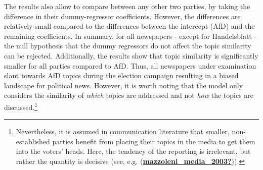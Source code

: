 \documentclass[
  12pt,
]{article}
\begin{document}
The results also allow to compare between any other two parties, by
taking the difference in their dummy-regressor coefficients. However,
the differences are relatively small compared to the differences between
the intercept (AfD) and the remaining coefficients. In summary, for all
newspapers - except for Handelsblatt - the null hypothesis that the
dummy regressors do not affect the topic similarity can be rejected.
Additionally, the results show that topic similarity is significantly
smaller for all parties compared to AfD. Thus, all newspapers under
examination slant towards AfD topics during the election campaign
resulting in a biased landscape for political news. However, it is worth
noting that the model only considers the similarity of \emph{which}
topics are addressed and not \emph{how} the topics are
discussed.\footnote{Nevertheless, it is assumed in communication
  literature that smaller, non-established parties benefit from placing
  their topics in the media to get them into the voters' heads. Here,
  the tendency of the reporting is irrelevant, but rather the quantity
  is decisive (see, e.g.
  (\protect\hyperlink{ref-mazzoleni_media_2003}{\textbf{mazzoleni\_media\_2003?}})).}
\end{document}
